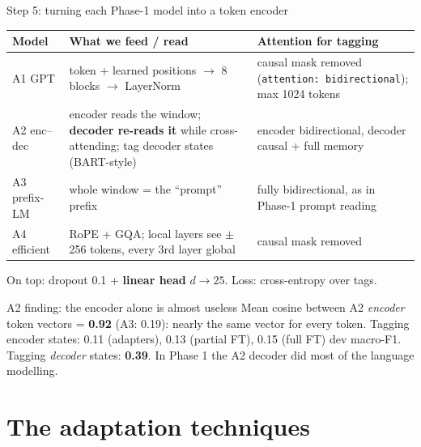 \documentclass[aspectratio=169,11pt]{beamer}
\newcommand{\code}[1]{\texttt{\small #1}}
\begin{document}
\begin{frame}{Step 5: turning each Phase-1 model into a token encoder}
  \footnotesize
  \begin{tabularx}{\textwidth}{@{}l>{\raggedright\arraybackslash}X>{\raggedright\arraybackslash}X@{}}
    \toprule
    Model & What we feed / read & Attention for tagging \\
    \midrule
    A1 GPT & token + learned positions $\to$ 8 blocks $\to$ LayerNorm & causal mask removed (\code{attention: bidirectional}); max 1024 tokens \\
    A2 enc--dec & encoder reads the window; \textbf{decoder re-reads it} while cross-attending; tag decoder states (BART-style) & encoder bidirectional, decoder causal + full memory \\
    A3 prefix-LM & whole window = the ``prompt'' prefix & fully bidirectional, as in Phase-1 prompt reading \\
    A4 efficient & RoPE + GQA; local layers see $\pm$256 tokens, every 3rd layer global & causal mask removed \\
    \bottomrule
  \end{tabularx}
  \vspace{2mm}

  On top: dropout 0.1 + \textbf{linear head} $d \to 25$. Loss: cross-entropy over tags.
  \vspace{1mm}
  \begin{alertblock}{A2 finding: the encoder alone is almost useless}
    Mean cosine between A2 \emph{encoder} token vectors = \textbf{0.92} (A3: 0.19): nearly the same vector for every token.
    Tagging encoder states: 0.11 (adapters), 0.13 (partial FT), 0.15 (full FT) dev macro-F1.
    Tagging \emph{decoder} states: \textbf{0.39}. In Phase 1 the A2 decoder did most of the language modelling.
  \end{alertblock}
\end{frame}

\section{The adaptation techniques}
\end{document}
